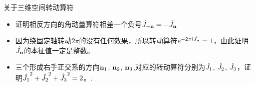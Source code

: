 \documentclass[CJK]{beamer}
\begin{document}
\begin{frame}
\bch
关于三维空间转动算符
\begin{itemize}
\item{证明相反方向的角动量算符相差一个负号$\hat{J}_{-{\mathbf{n}}} = - {\hat{J_{\mathbf{n}}}}$}
\item{因为绕固定轴转动$2\pi$的没有任何效果，所以转动算符$e^{-2\pi{\dot{\imath}}{\hat{J_{\mathbf{n}}}}}=1$，由此证明${\hat{J_{\mathbf{n}}}}$的本征值一定是整数。}
\item{三个形成右手正交系的方向${\mathbf{n}}_1$, ${\mathbf{n}}_2$, ${\mathbf{n}}_3$,对应的转动算符分别为$\hat{J_{1}} $, $\hat{J_{2}} $, $\hat{J_{3}}$，证明$\hat{J_{1}}^2+\hat{J_{2}}^2+\hat{J_{3}}^2 = 2$。.}
\end{itemize}
\ech
\end{frame}
\end{document}

